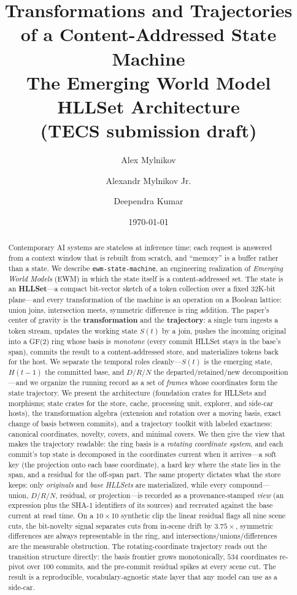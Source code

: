 \documentclass[11pt,a4paper]{article}
\title{\textbf{Transformations and Trajectories of a Content-Addressed
State Machine}\\[4pt]
\large The Emerging World Model HLLSet Architecture\\[6pt]
\normalsize (TECS submission draft)}
\author{Alex Mylnikov \and Alexandr Mylnikov Jr. \and Deependra Kumar}
\date{\today}
\theoremstyle{remark}
\begin{document}
\maketitle

\begin{abstract}
Contemporary AI systems are stateless at inference time: each request is
answered from a context window that is rebuilt from scratch, and ``memory'' is a
buffer rather than a state. We describe \texttt{ewm-state-machine}, an
engineering realization of \emph{Emerging World Models} (EWM) in which the state
itself is a content-addressed set. The state is an \textbf{HLLSet}---a compact
bit-vector sketch of a token collection over a fixed $32$K-bit plane---and every
transformation of the machine is an operation on a Boolean lattice: union joins,
intersection meets, symmetric difference is ring addition. The paper's center of
gravity is the \textbf{transformation} and the \textbf{trajectory}: a single
turn ingests a token stream, updates the working state $S(t)$ by a join, pushes
the incoming original into a GF(2) ring whose basis is \emph{monotone}
(every commit HLLSet stays in the base's span), commits the result to a
content-addressed store, and materializes tokens back for the host. We separate
the temporal roles cleanly---$S(t)$ is the emerging state, $H(t{-}1)$ the
committed base, and $D/R/N$ the departed/retained/new decomposition---and we
organize the running record as a set of \emph{frames} whose coordinates form the
state trajectory. We present the architecture (foundation crates for HLLSets and
morphisms; state crates for the store, cache, processing unit, explorer, and
side-car hosts), the transformation algebra (extension and rotation over a
moving basis, exact change of basis between commits), and a trajectory toolkit
with labeled exactness: canonical coordinates, novelty, covers, and minimal
covers. We then give the view that makes the trajectory readable: the ring basis
is a \emph{rotating coordinate system}, and each commit's top state is
decomposed in the coordinates current when it arrives---a soft key (the
projection onto each base coordinate), a hard key where the state lies in the
span, and a residual for the off-span part. The same property dictates what the
store keeps: only \emph{originals} and \emph{base HLLSets} are materialized,
while every compound---union, $D/R/N$, residual, or projection---is recorded as
a provenance-stamped \emph{view} (an expression plus the SHA-1 identifiers of
its sources) and recreated against the base current at read time. On a
$10\times10$ synthetic
clip the linear residual flags all nine scene cuts, the bit-novelty signal
separates cuts from in-scene drift by $3.75\times$, symmetric differences are
always representable in the ring, and intersections/unions/differences are the
measurable obstruction. The rotating-coordinate trajectory reads out the
transition structure directly: the basis frontier grows monotonically, $534$
coordinates re-pivot over $100$ commits, and the pre-commit residual spikes at
every scene cut. The result is a reproducible, vocabulary-agnostic
state layer that any model can use as a side-car.
\end{abstract}
\end{document}

